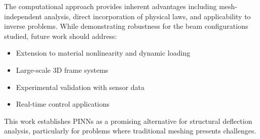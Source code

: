 \documentclass[12pt]{article}
\begin{document}
The computational approach provides inherent advantages including mesh-independent analysis, direct incorporation of physical laws, and applicability to inverse problems. While demonstrating robustness for the beam configurations studied, future work should address:

\begin{itemize}
	\item Extension to material nonlinearity and dynamic loading
\item Large-scale 3D frame systems
\item Experimental validation with sensor data
\item Real-time control applications
\end{itemize}

This work establishes PINNs as a promising alternative for structural deflection analysis, particularly for problems where traditional meshing presents challenges.

\pagebreak


\end{document}
